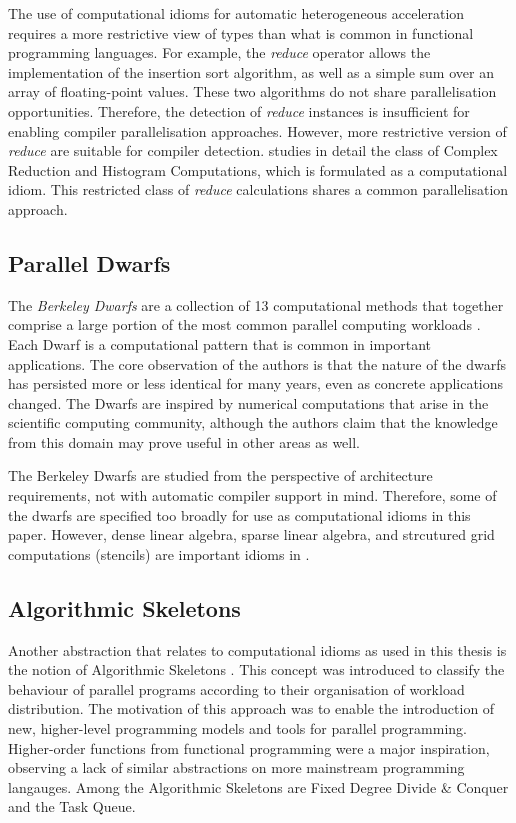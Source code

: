     The use of computational idioms for automatic heterogeneous acceleration
    requires a more restrictive view of types than what is common in
    functional programming languages.
    For example, the {\it reduce} operator allows the implementation of
    the insertion sort algorithm, as well as a simple sum over an array of
    floating-point values.
    These two algorithms do not share parallelisation opportunities.
    Therefore, the detection of {\it reduce} instances is insufficient for
    enabling compiler parallelisation approaches.
    However, more restrictive version of {\it reduce} are suitable for
    compiler detection.
     studies in detail the class of Complex Reduction
    and Histogram Computations, which is formulated as a computational idiom.
    This restricted class of {\it reduce} calculations shares a common
    parallelisation approach.

\subsection{Parallel Dwarfs}

    The {\it Berkeley Dwarfs} are a collection of 13 computational methods
    that together comprise a large portion of the most common parallel computing
    workloads \citep{Asanovic06thelandscape}.
    Each Dwarf is a computational pattern that is common in important
    applications.
    The core observation of the authors is that the nature of the dwarfs has
    persisted more or less identical for many years, even as concrete
    applications changed.
    The Dwarfs are inspired by numerical computations that arise in the
    scientific computing community, although the authors claim that the
    knowledge from this domain may prove useful in other areas as well.

    The Berkeley Dwarfs are studied from the perspective of architecture
    requirements, not with automatic compiler support in mind.
    Therefore, some of the dwarfs are specified too broadly for use as
    computational idioms in this paper.
    However, dense linear algebra, sparse linear algebra, and strcutured grid
    computations (stencils) are important idioms in .

\subsection{Algorithmic Skeletons}

    Another abstraction that relates to computational idioms as used in this
    thesis is the notion of Algorithmic Skeletons \citep{Cole1991Algorithmic}.
    This concept was introduced to classify the behaviour of parallel programs
    according to their organisation of workload distribution.
    The motivation of this approach was to enable the introduction of new,
    higher-level programming models and tools for parallel programming.
    Higher-order functions from functional programming were a major inspiration,
    observing a lack of similar abstractions on more mainstream programming
    langauges.
    Among the Algorithmic Skeletons are Fixed Degree Divide \& Conquer and the
    Task Queue.


